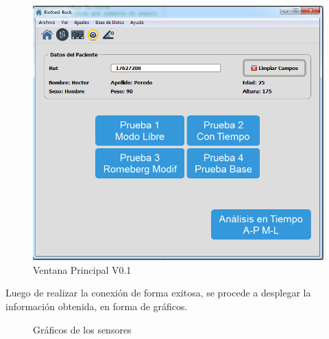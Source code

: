 \documentclass[12pt,a4paper]{article}
\begin{document}
\begin{figure}[H]
	\centering
	\includegraphics[scale=0.6]{images/mainwindow}
	\caption{Ventana Principal V0.1}
	\label{fig:mainwindow}
\end{figure}

Luego de realizar la conexión de forma exitosa, se procede a desplegar la información obtenida, en forma de gráficos.

\begin{figure}[H]
	\centering
	\caption{Gráficos de los sensores}
	\label{fig:Graficosensores}
\end{figure}
\end{document}
